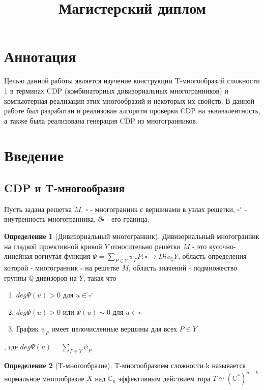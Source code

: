 \documentclass[fontsize=14pt]{scrartcl}
\title{Магистерский диплом}
\theoremstyle{definition}
\newtheorem{definition}{Определение}[section]
\begin{document}
\sloppy



\section{Аннотация}
Целью данной работы является изучение конструкции T-многообразий сложности 1 в терминах CDP (комбинаторных дивизориальных многогранников) и компьютерная реализация этих многообразий и некоторых их свойств. В данной работе был разработан и реализован алгоритм проверки CDP на эквивалентность, а также была реализована генерация CDP из многогранников.


\clearpage

\tableofcontents

\clearpage

\section{Введение}



\subsection{CDP и T-многообразия}

Пусть задана решетка $M$, $\square$ - многогранник с вершинами в узлах решетки, $\square^{\circ}$ - внутренность многогранника, $\partial\square$ - его граница.
\begin{definition}[Дивизориальный многогранник]
Дивизориальный многогранник на гладкой проективной кривой $Y$ относительно решетки $M$ - это кусочно-линейная вогнутая функция $\Psi = \sum_{P \in Y}\psi_P \dot P: \square \rightarrow Div_{\mathds{Q}}Y$, область определения которой - многогранник $\square$ на решетке $M$, область значений - подмножество группы $\mathds{Q}$-дивизоров на $Y$, такая что
\begin{enumerate}
	\item $deg\Psi(u) > 0$ для $u \in \square^{\circ}$
	\item $deg\Psi(u) > 0$ или $\Psi(u) \sim 0$ для $u \in \square$
	\item График $\psi_P$ имеет целочисленные вершины для всех $P \in Y$
\end{enumerate}, где $deg\Psi(u) = \sum_{P \in Y}\psi_P$
\end{definition}


\begin{definition}[T-многообразие]
T-многообразием сложности k называется нормальное многообразие $X$ над $\mathds{C}_n$ эффективным действием тора $T \simeq (\mathds{C}^{*})^{n-k}$
\end{definition}
\end{document}
